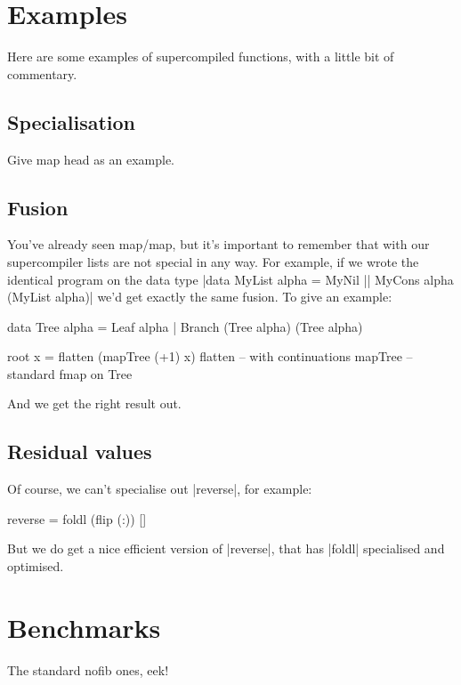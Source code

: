 \documentclass[draft]{sigplanconf}
\begin{document}
\section{Examples}
\label{sec:examples}

Here are some examples of supercompiled functions, with a little bit of commentary.

\subsection{Specialisation}

Give map head as an example.

\subsection{Fusion}

You've already seen map/map, but it's important to remember that with our supercompiler lists are not special in any way. For example, if we wrote the identical program on the data type |data MyList alpha = MyNil || MyCons alpha (MyList alpha)| we'd get exactly the same fusion. To give an example:

\begin{code}
data Tree alpha = Leaf alpha | Branch (Tree alpha) (Tree alpha)

root x = flatten (mapTree (+1) x)
flatten -- with continuations
mapTree -- standard fmap on Tree
\end{code}

And we get the right result out.

\subsection{Residual values}

Of course, we can't specialise out |reverse|, for example:

\begin{code}
reverse = foldl (flip (:)) []
\end{code}

But we do get a nice efficient version of |reverse|, that has |foldl| specialised and optimised.

\section{Benchmarks}
\label{sec:benchmarks}

The standard nofib ones, eek!
\end{document}

